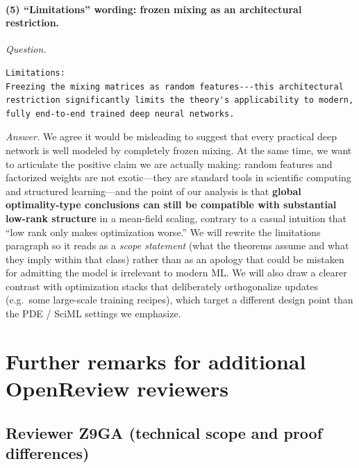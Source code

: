 \documentclass[11pt,a4paper]{article}
\begin{document}
\paragraph{(5) ``Limitations'' wording: frozen mixing as an architectural restriction.}
\textit{Question.}\par
\begin{verbatim}
Limitations:
Freezing the mixing matrices as random features---this architectural restriction significantly limits the theory's applicability to modern, fully end-to-end trained deep neural networks.
\end{verbatim}
\textit{Answer.} We agree it would be misleading to suggest that every practical deep network is well modeled by completely frozen mixing. At the same time, we want to articulate the positive claim we are actually making: random features and factorized weights are not exotic---they are standard tools in scientific computing and structured learning---and the point of our analysis is that \textbf{global optimality-type conclusions can still be compatible with substantial low-rank structure} in a mean-field scaling, contrary to a casual intuition that ``low rank only makes optimization worse.'' We will rewrite the limitations paragraph so it reads as a \emph{scope statement} (what the theorems assume and what they imply within that class) rather than as an apology that could be mistaken for admitting the model is irrelevant to modern ML. We will also draw a clearer contrast with optimization stacks that deliberately orthogonalize updates (e.g.\ some large-scale training recipes), which target a different design point than the PDE / SciML settings we emphasize.

\section*{Further remarks for additional OpenReview reviewers}

\subsection*{Reviewer Z9GA (technical scope and proof differences)}
\end{document}
